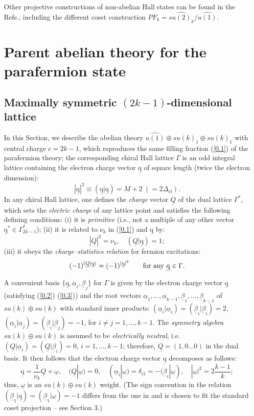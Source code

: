 \documentclass[a4paper,12pt]{article}
\newcommand{\clth}{\setcounter{thm}{0}}
\newcommand{\sectionnew}[1]{\section{#1}\clth}
\newcommand{\beq}{\begin{equation}}
\newcommand{\eeq}{\end{equation}}
\def \a {\underline{\alpha}}
\def \Q {\underline{Q}}
\def \q {\underline{\mathrm{q}}}
\def \b {\underline{\beta}}
\def \d {\delta}
\def \D {\Delta}
\def \o {\underline{\omega}}
\def \G   {\Gamma}
\def\U1{{\widehat{u(1)}}}
\begin{document}
Other projective constructions of non-abelian Hall states can be found in
the Refs.\cite{schout}, including the different coset construction
$PF_k = \widehat{su(2)_k}/\U1$.



\sectionnew{Parent abelian theory for the para\-fermion state}


\subsection{Maximally symmetric $(2k-1)$-dimensional lattice}

In this Section, we describe the abelian theory
$\U1\oplus su(k)_1 \oplus su(k)_1$ with central charge
$c=2k-1$, which reproduces the same
filling fraction (\ref{0.1}) of the parafermion theory; 
the corresponding chiral Hall lattice $\G$ is an odd integral lattice
containing the electron charge vector $\q$ of square length
(twice the electron dimension):
\beq\label{0.2}
|\q|^2\equiv (\q|\q)=M+2 \; (=2\D_{\mathrm{el}}).
\eeq
In any chiral Hall lattice, one defines the {\it charge} vector $\Q$ of the 
dual lattice $\G^*$, which sets the {\it electric charge} 
of any lattice point and satisfies the following defining conditions: 
(i) it is {\it primitive} (i.e., not a multiple of any other vector
$\q^*\in\G^*_{2k-1}$); (ii) it is related to $\nu_k$ in (\ref{0.1})
and $\q$ by:
\beq\label{0.3}
|\Q|^2=\nu_k, \quad (\Q|\q)=1;
\eeq
(iii) it obeys the {\it charge--statistics relation} for fermion excitations:
\beq\label{0.3b}
(-1)^{(\Q|\q)}=(-1)^{|\q|^2} \qquad {\rm for \ any} \ \q\in\G.
\eeq

A convenient basis $\{\q,\a_i,\b_j\}$ for $\G$ is given by the electron
charge vector $\q$ (satisfying (\ref{0.2}) (\ref{0.3})) and the root vectors
$\a_1,\ldots ,\a_{k-1},\b_1,\ldots,\b_{k-1}$ of $su(k)\oplus su(k)$ with
standard inner products:
$(\a_i|\a_i)=(\b_i|\b_i)=2$, $(\a_i|\a_j)=(\b_i|\b_j)=-1$,
for $i\neq j=1,\dots ,k-1$.
The {\it symmetry algebra} $su(k)\oplus su(k)$ is assumed to be
{\it electrically neutral}, i.e. 
$(\Q|\a_i)=(\Q|\b_i)=0$, $i=1,\ldots,k-1$;
therefore, $\Q =(1,0 \dots 0)$ in the dual basis.
It then follows that the electron charge vector $ \q $
decomposes as follows:
\beq\label{1.3}
\q=\frac{1}{\nu_k}\Q +\o, \quad (\Q|\o)=0, \quad
 (\a_i|\o)=\d_{i1}=-(\b_i|\o), \quad |\o|^2=2\frac{k-1}{k};
\eeq
thus, $\o$ is an $su(k)\oplus su(k)$  weight.
(The sign convention in the relation $(\b_1|\q)=(\b_1|\o)=-1$
differs from the one in \cite{cgt} and is chosen to fit
the standard coset projection -- see Section 3.)
\end{document}
